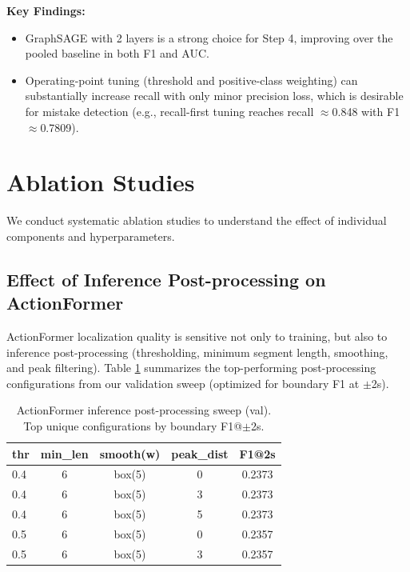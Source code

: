 \documentclass[10pt,twocolumn,letterpaper]{article}
\newcommand{\tighttabcolsep}{\setlength{\tabcolsep}{3pt}}
\newcommand{\tighttablerowstretch}{\renewcommand{\arraystretch}{1.05}}
\begin{document}
\textbf{Key Findings:}
\begin{itemize}
    \item GraphSAGE with 2 layers is a strong choice for Step 4, improving over the pooled baseline in both F1 and AUC.
    \item Operating-point tuning (threshold and positive-class weighting) can substantially increase recall with only minor precision loss, which is desirable for mistake detection (e.g., recall-first tuning reaches recall $\approx$0.848 with F1 $\approx$0.7809).
\end{itemize}

\section{Ablation Studies}

We conduct systematic ablation studies to understand the effect of individual components and hyperparameters.

\subsection{Effect of Inference Post-processing on ActionFormer}

ActionFormer localization quality is sensitive not only to training, but also to inference post-processing (thresholding, minimum segment length, smoothing, and peak filtering). Table \ref{tab:actionformer_grid} summarizes the top-performing post-processing configurations from our validation sweep (optimized for boundary F1 at $\pm$2s).

\begin{table}[h]
\centering
\caption{ActionFormer inference post-processing sweep (val). Top unique configurations by boundary F1@$\pm$2s.}
\label{tab:actionformer_grid}
{\scriptsize\tighttabcolsep\tighttablerowstretch
\begin{tabular}{lcccc}
\toprule
thr & min\_len & smooth(w) & peak\_dist & F1@2s \\
\midrule
0.4 & 6 & box(5) & 0 & 0.2373 \\
0.4 & 6 & box(5) & 3 & 0.2373 \\
0.4 & 6 & box(5) & 5 & 0.2373 \\
0.5 & 6 & box(5) & 0 & 0.2357 \\
0.5 & 6 & box(5) & 3 & 0.2357 \\
\bottomrule
\end{tabular}
}
\end{table}
\end{document}
